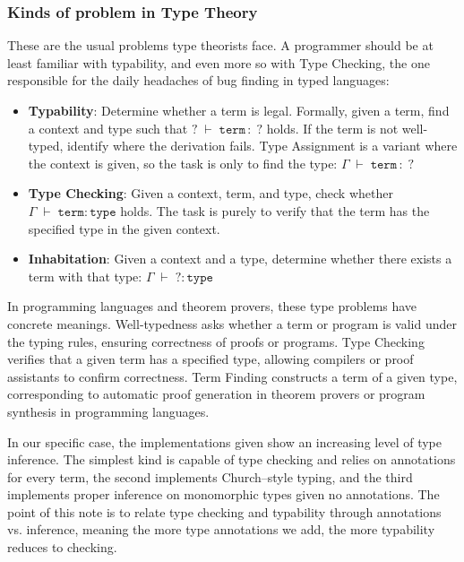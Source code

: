 \subsubsection{\centering Kinds of problem in Type Theory}
These are the usual problems type theorists face. A programmer should be at least familiar with typability, and even more so with Type Checking, the one responsible for the daily headaches of bug finding in typed languages:
\begin{itemize}
\item \textbf{Typability}:
  Determine whether a term is legal. Formally, given a term, find a context and type such that
  \( ? \;\vdash\; \texttt{term} \, : \; ? \) holds. If the term is not well-typed, identify where the derivation fails. Type Assignment is a variant where the context is given, so the task is only to find the type: \( \Gamma \;\vdash\; \texttt{term} \, : \; ? \)
\item \textbf{Type Checking}: 
  Given a context, term, and type, check whether \( \Gamma \;\vdash\; \texttt{term} : \texttt{type} \)
  holds. The task is purely to verify that the term has the specified type in the given context.
\item \textbf{Inhabitation}: 
  Given a context and a type, determine whether there exists a term with that type: \( \Gamma \;\vdash\; ? : \texttt{type}  \)
\end{itemize}
\begin{remark}
  In programming languages and theorem provers, these type problems have concrete meanings. Well-typedness asks whether a term or program is valid under the typing rules, ensuring correctness of proofs or programs. Type Checking verifies that a given term has a specified type, allowing compilers or proof assistants to confirm correctness. Term Finding constructs a term of a given type, corresponding to automatic proof generation in theorem provers or program synthesis in programming languages.
\end{remark}
\begin{note}
  In our specific case, the implementations given show an increasing level of type inference. The simplest kind is capable of type checking and relies on annotations for every term, the second implements Church--style typing, and the third implements proper inference on monomorphic types given no annotations. The point of this note is to relate type checking and typability through annotations vs. inference, meaning the more type annotations we add, the more typability reduces to checking.
\end{note}
